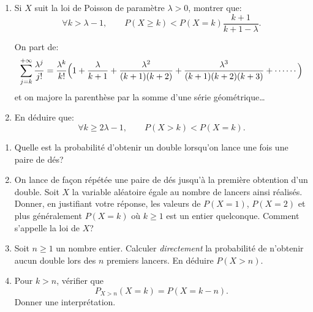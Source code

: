 \documentclass[a4paper,12pt,reqno]{amsart}
\begin{document}
\begin{exo}

  \begin{enumerate}
    \item Si $X$ suit la loi de Poisson de paramètre $\lambda>0$, montrer que:
      $$
        \forall k>\lambda-1,\qquad P(X\geq k)<P(X=k)\frac{k+1}{k+1-\lambda}.
      $$
      \begin{indication}
      On part de:
        $$
          \sum_{j=k}^{+\infty}\frac{\lambda^j}{j!}=
            \frac{\lambda^k}{k!}\Bigl(1+\frac{\lambda}{k+1}+
              \frac{\lambda^2}{(k+1)(k+2)}+\frac{\lambda^3}{(k+1)(k+2)(k+3)}
                + \cdots\cdots\Bigr)
        $$
      et on majore la parenthèse par la somme d'une série géométrique\dots
      \end{indication}
    \item En déduire que:
      $$
        \forall k\geq 2\lambda-1,\qquad P(X>k)<P(X=k).
      $$
  \end{enumerate}

\end{exo}
\begin{exo}

  \begin{enumerate}
    \item Quelle est la probabilité d'obtenir un double lorsqu'on lance une fois une paire de dés?
    \item On lance de façon répétée une paire de dés jusqu'à la première obtention d'un double. Soit $X$ la variable aléatoire égale au nombre de lancers ainsi réalisés. Donner, en justifiant votre réponse, les valeurs de $P(X=1)$, $P(X=2)$ et plus généralement $P(X=k)$ où $k\geq 1$ est un entier quelconque. Comment s'appelle la loi de $X$?
    \item Soit $n\geq 1$ un nombre entier. Calculer \emph{directement} la probabilité de n'obtenir aucun double lors des $n$ premiers lancers. En déduire $P(X>n)$.
    \item Pour $k>n$, vérifier que
      $$
        P_{X>n}(X=k)=P(X=k-n).
      $$
    Donner une interprétation.
  \end{enumerate}

\end{exo}
\end{document}
